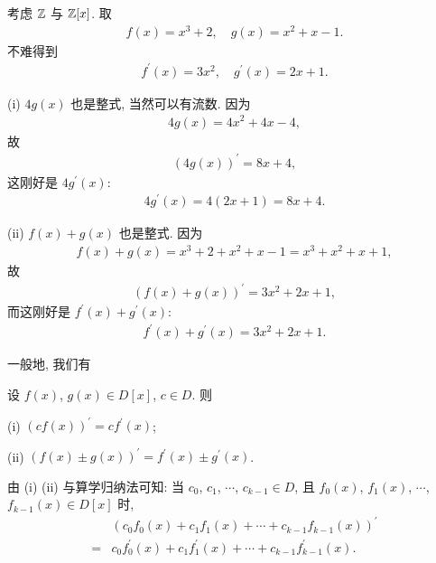 \begin{example}
    考虑 $\mathbb{Z}$ 与 $\mathbb{Z}[x]$. 取
    \begin{align*}
        f(x) = x^3 + 2, \quad g(x) = x^2 + x - 1.
    \end{align*}
    不难得到
    \begin{align*}
        f^{\prime} (x) = 3x^2, \quad g^{\prime} (x) = 2x + 1.
    \end{align*}

    (i) $4g(x)$ 也是整式, 当然可以有流数. 因为
    \begin{align*}
        4g(x) = 4x^2 + 4x - 4,
    \end{align*}
    故
    \begin{align*}
        (4g(x))^{\prime} = 8x + 4,
    \end{align*}
    这刚好是 $4g^{\prime} (x)$:
    \begin{align*}
        4g^{\prime} (x) = 4(2x + 1) = 8x + 4.
    \end{align*}

    (ii) $f(x) + g(x)$ 也是整式. 因为
    \begin{align*}
        f(x) + g(x) = x^3 + 2 + x^2 + x - 1 = x^3 + x^2 + x + 1,
    \end{align*}
    故
    \begin{align*}
        (f(x) + g(x))^{\prime} = 3x^2 + 2x + 1,
    \end{align*}
    而这刚好是 $f^{\prime} (x) + g^{\prime} (x)$:
    \begin{align*}
        f^{\prime} (x) + g^{\prime} (x) = 3x^2 + 2x + 1.
    \end{align*}
\end{example}

一般地, 我们有
\begin{proposition}
    设 $f(x)$, $g(x) \in D[x]$, $c \in D$. 则

    (i) $(cf(x))^{\prime} = c f^{\prime} (x)$;

    (ii) $(f(x) \pm g(x))^{\prime} = f^{\prime} (x) \pm g^{\prime} (x)$.

    由 (i) (ii) 与算学归纳法可知: 当 $c_0$, $c_1$, $\cdots$, $c_{k-1} \in D$, 且 $f_0 (x)$, $f_1 (x)$, $\cdots$, $f_{k-1} (x) \in D[x]$ 时,
    \begin{align*}
             & (c_0 f_0(x) + c_1 f_1(x) + \cdots + c_{k-1} f_{k-1}(x))^{\prime}                  \\
        = {} & c_0 f^{\prime}_0(x) + c_1 f^{\prime}_1(x) + \cdots + c_{k-1} f^{\prime}_{k-1}(x).
    \end{align*}
\end{proposition}

